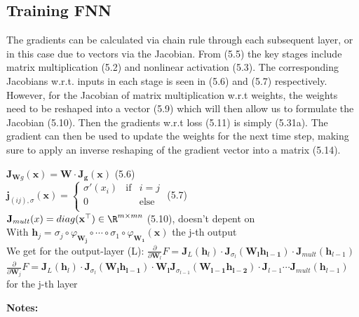 \documentclass[english]{latex4ei/latex4ei_sheet}
\begin{document}
\begin{sectionbox}
\subsection{Training FNN}
The gradients can be calculated via chain rule through each subsequent layer, or in this case due to vectors via the Jacobian. From (5.5) the key stages include matrix multiplication (5.2) and nonlinear activation (5.3). The corresponding Jacobians w.r.t. inputs in each stage is seen in (5.6) and (5.7) respectively. However, for the Jacobian of matrix multiplication w.r.t weights, the weights need to be reshaped into a vector (5.9) which will then allow us to formulate the Jacobian (5.10). Then the gradients w.r.t loss (5.11) is simply (5.31a). The gradient can then be used to update the weights for the next time step, making sure to apply an inverse reshaping of the gradient vector into a matrix (5.14).
\begin{emphbox}
    $\mathbf{J}_{\mathbf{W} g}(\mathbf{x})=\mathbf{W\cdot J_g}(\mathbf{x})$ (5.6)\\
    $\mathbf{j}_{(ij),\sigma}(\mathbf{x}) = \left\{ \begin{array}{rcl}
     \sigma'(x_i) & \mbox{if}
& i=j \\ 0 & & \mbox{else}\\
\end{array}\right.$ (5.7)\\
$\mathbf{J}_{mult}(x)=diag(\mathbf{x}^{\top})\in\R^{m\times mn}$ (5.10), doesn't depent on\\
With $\mathbf{h}_j=\sigma_j\circ\varphi_\mathbf{W_j}\circ\cdots\circ\sigma_1\circ\varphi_{\mathbf{W_1}}(\mathbf{x})$ the j-th output\\
We get for the output-layer (L): $\frac{\partial}{\partial\mathbf{W}_l}F=\mathbf{J}_L(\mathbf{h}_l)\cdot\mathbf{J}_{\sigma_l}(\mathbf{W_lh_{l-1}})\cdot\mathbf{J}_{mult}(\mathbf{h}_{l-1})$\\

$\frac{\partial}{\partial\mathbf{W}_j}F=\mathbf{J}_L(\mathbf{h}_l)\cdot\mathbf{J}_{\sigma_l}(\mathbf{W_lh_{l-1}})\cdot\mathbf{W_l}\mathbf{J}_{\sigma_{l-1}}(\mathbf{W_{l-1}h_{l-2}})\cdot\mathbf{J}_{l-1}\cdots \mathbf{J}_{mult}(\mathbf{h}_{l-1})$ for the j-th layer
\end{emphbox}
\end{sectionbox}
\textbf{Notes:}

\vspace{200}
\end{document}
